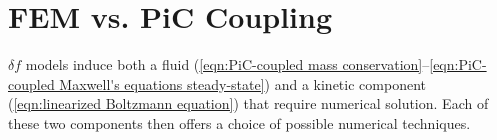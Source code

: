 \section{FEM vs. PiC Coupling}\label{cha:FEM vs. PiC}
    $\delta\!f$ models induce both a fluid (\ref{eqn:PiC-coupled mass conservation}--\ref{eqn:PiC-coupled Maxwell's equations steady-state}) and a kinetic component (\ref{eqn:linearized Boltzmann equation}) that require numerical solution. Each of these two components then offers a choice of possible numerical techniques.
    
    \line

    
    

    \line

